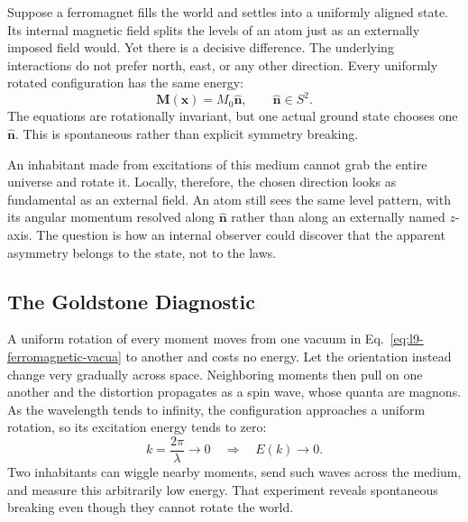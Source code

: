 Suppose a ferromagnet fills the world and settles into a uniformly aligned state. Its internal magnetic field splits the levels of an atom just as an externally imposed field would. Yet there is a decisive difference. The underlying interactions do not prefer north, east, or any other direction. Every uniformly rotated configuration has the same energy:
\begin{equation}
\mathbf M(\mathbf x)=M_0\hat{\mathbf n},
\qquad
\hat{\mathbf n}\in S^2.
\label{eq:l9-ferromagnetic-vacua}
\end{equation}
The equations are rotationally invariant, but one actual ground state chooses one \(\hat{\mathbf n}\). This is spontaneous rather than explicit symmetry breaking.

An inhabitant made from excitations of this medium cannot grab the entire universe and rotate it. Locally, therefore, the chosen direction looks as fundamental as an external field. An atom still sees the same level pattern, with its angular momentum resolved along \(\hat{\mathbf n}\) rather than along an externally named \(z\)-axis. The question is how an internal observer could discover that the apparent asymmetry belongs to the state, not to the laws.

\subsection{The Goldstone Diagnostic}

A uniform rotation of every moment moves from one vacuum in Eq.~\eqref{eq:l9-ferromagnetic-vacua} to another and costs no energy. Let the orientation instead change very gradually across space. Neighboring moments then pull on one another and the distortion propagates as a spin wave, whose quanta are magnons. As the wavelength tends to infinity, the configuration approaches a uniform rotation, so its excitation energy tends to zero:
\begin{equation}
k=\frac{2\pi}{\lambda}\longrightarrow0
\quad\Longrightarrow\quad
E(k)\longrightarrow0.
\label{eq:l9-gapless-magnon}
\end{equation}
Two inhabitants can wiggle nearby moments, send such waves across the medium, and measure this arbitrarily low energy. That experiment reveals spontaneous breaking even though they cannot rotate the world.


